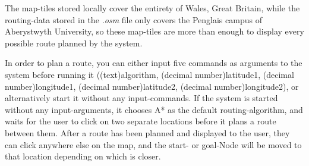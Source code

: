 The map-tiles stored locally cover the entirety of Wales, Great Britain, while the routing-data stored in the \textit{.osm} file only covers the Penglais campus of Aberystwyth University, so these map-tiles are more than enough to display every possible route planned by the system.

In order to plan a route, you can either input five commands as arguments to the system before running it ((text)algorithm, (decimal number)latitude1, (decimal number)longitude1, (decimal number)latitude2, (decimal number)longitude2), or alternatively start it without any input-commands. If the system is started without any input-arguments, it chooses A* as the default routing-algorithm, and waits for the user to click on two separate locations before it plans a route between them. After a route has been planned and displayed to the user, they can click anywhere else on the map, and the start- or goal-Node will be moved to that location depending on which is closer.

